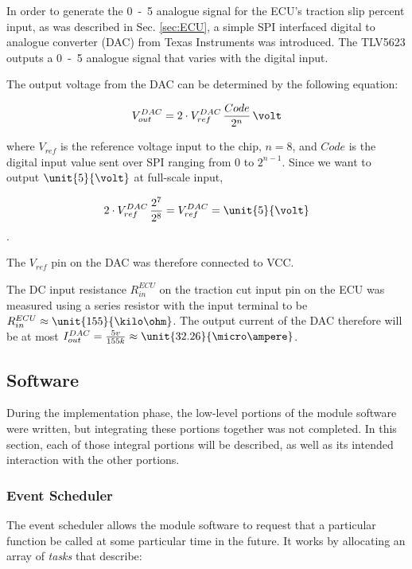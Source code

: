 In order to generate the \unit{0-5}{\volt} analogue signal for the ECU's traction slip percent input, as was described in Sec. \ref{sec:ECU}, a simple SPI interfaced digital to analogue converter (DAC) from Texas Instruments was introduced. The TLV5623 outputs a \unit{0-5}{\volt} analogue signal that varies with the digital input.

The output voltage from the DAC can be determined by the following equation: \cite{TLV5623}

\begin{equation}
V_{out}^{DAC}=2\cdot{V_{ref}^{DAC}}\,\frac{Code}{2^{n}}\,\volt
\end{equation}

where $V_{ref}$ is the reference voltage input to the chip, $n=8$, and $Code$ is the digital input value sent over SPI ranging from $0$ to $2^{n-1}$. Since we want to output $\unit{5}{\volt}$ at full-scale input,

\begin{equation}
2\cdot{V_{ref}^{DAC}}\,\frac{2^{7}}{2^{8}}=V_{ref}^{DAC}=\unit{5}{\volt}
\end{equation}.

The $V_{ref}$ pin on the DAC was therefore connected to VCC.

The DC input resistance $R_{in}^{ECU}$ on the traction cut input pin on the ECU was measured using a series resistor with the input terminal to be $R_{in}^{ECU}\approx\unit{155}{\kilo\ohm}$. The output current of the DAC therefore will be at most $I_{out}^{DAC}=\frac{5v}{155k}\approx\unit{32.26}{\micro\ampere}$.

\subsection{Software}

During the implementation phase, the low-level portions of the module software were written, but integrating these portions together was not completed. In this section, each of those integral portions will be described, as well as its intended interaction with the other portions.

\subsubsection{Event Scheduler}

The event scheduler allows the module software to request that a particular function be called at some particular time in the future. It works by allocating an array of \emph{tasks} that describe:

